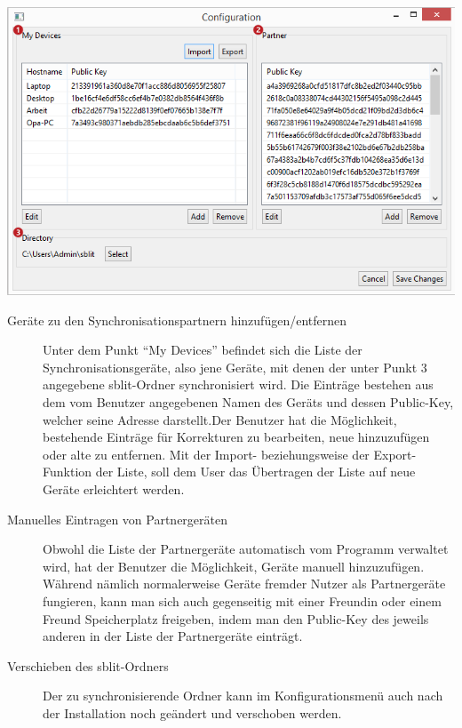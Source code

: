\includegraphics[]{images/config_gui.png}

\begin{description}

	\item[{Geräte zu den Synchronisationspartnern hinzufügen/entfernen}]
		Unter dem Punkt “My Devices” befindet sich die Liste der
		Synchronisationsgeräte, also jene Geräte, mit denen der unter Punkt 3
		angegebene sblit-Ordner synchronisiert wird. Die Einträge
		bestehen aus dem vom Benutzer angegebenen Namen des Geräts und dessen
		Public-Key, welcher seine Adresse darstellt.Der Benutzer hat die
		Möglichkeit, bestehende Einträge für Korrekturen zu bearbeiten, neue
		hinzuzufügen oder alte zu entfernen. Mit der Import- beziehungsweise der
		Export-Funktion der Liste, soll dem User das Übertragen der Liste auf neue
		Geräte erleichtert werden.

	\item[{Manuelles Eintragen von Partnergeräten}]
		Obwohl die Liste der Partnergeräte automatisch vom Programm verwaltet wird,
		hat der Benutzer die Möglichkeit, Geräte manuell hinzuzufügen. Während
		nämlich normalerweise Geräte fremder Nutzer als Partnergeräte fungieren,
		kann man sich auch gegenseitig mit einer Freundin oder einem Freund
		Speicherplatz freigeben, indem man den Public-Key des jeweils anderen in der
		Liste der Partnergeräte einträgt.

	\item[{Verschieben des sblit-Ordners}]
		Der zu synchronisierende Ordner kann im Konfigurationsmenü auch nach der
		Installation noch geändert und verschoben werden.

\end{description}
